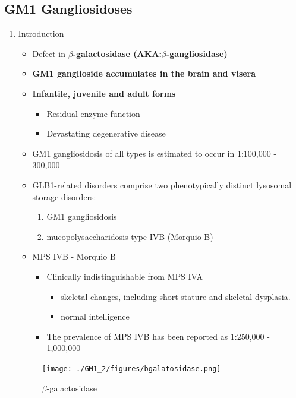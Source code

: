 \documentclass{scrartcl}
\begin{document}
\subsection{GM1 Gangliosidoses}
\label{sec:org07780b7}
\begin{enumerate}
\item Introduction
\label{sec:org4ef26a1}

\begin{itemize}
\item Defect in \textbf{\(\beta\)-galactosidase (AKA:\(\beta\)-gangliosidase)}
\item \textbf{GM1 ganglioside accumulates in the brain and visera}
\item \textbf{Infantile, juvenile and adult forms}
\begin{itemize}
\item Residual enzyme function
\item Devastating degenerative disease
\end{itemize}
\item GM1 gangliosidosis of all types is estimated to occur in 1:100,000 - 300,000

\item GLB1-related disorders comprise two phenotypically distinct lysosomal storage disorders:
\begin{enumerate}
\item GM1 gangliosidosis
\item mucopolysaccharidosis type IVB (Morquio B)
\end{enumerate}

\item MPS IVB - Morquio B
\begin{itemize}
\item Clinically indistinguishable from MPS IVA 
\begin{itemize}
\item skeletal changes, including short stature and skeletal dysplasia.
\item normal intelligence
\end{itemize}
\item The prevalence of MPS IVB has been reported as 1:250,000 - 1,000,000
\end{itemize}
\end{itemize}

\begin{figure}[htbp]
\centering
\texttt{[image: ./GM1\_2/figures/bgalatosidase.png]}
\caption{\label{fig:org95aa881}
\(\beta\)-galactosidase}
\end{figure}



\end{enumerate}
\end{document}
